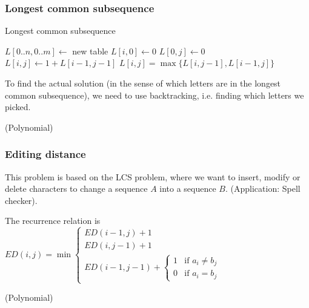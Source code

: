 \newpage
\subsubsection{Longest common subsequence}
\begin{algorithm}
    \begin{spacing}{1.2}
        \caption{Longest common subsequence}
        \begin{algorithmic}[1]
            \State $L[0..n, 0..m] \gets$ new table
                $L[i, 0] \gets 0$
            \EndFor
                $L[0, j] \gets 0$
            \EndFor
                        $L[i, j] \gets 1 + L[i - 1, j - 1]$
                    \Else
                        \hspace{2mm} $L[i, j] = \max\{L[i, j - 1], L[i - 1, j]\}$
                    \EndIf
                \EndFor
            \EndFor
        \end{algorithmic}
    \end{spacing}
\end{algorithm}

To find the actual solution (in the sense of which letters are in the longest common subsequence), we need to use backtracking, i.e. finding which letters we picked.

\timecomplexity {} (Polynomial)


\subsubsection{Editing distance}
This problem is based on the LCS problem, where we want to insert, modify or delete characters to change a sequence $A$ into a sequence $B$. (Application: Spell checker). 

The recurrence relation is $ED(i, j) = \min \begin{cases}
    ED(i - 1, j) + 1\\
    ED(i, j - 1) + 1\\
    ED(i - 1, j - 1) + \begin{cases}
        1 & \text{if } a_i \neq b_j\\
        0 & \text{if } a_i = b_j
    \end{cases}
\end{cases}$

\timecomplexity {} (Polynomial)

